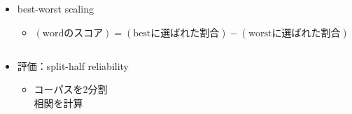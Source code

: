 \begin{frame}
\begin{enumerate}
\begin{description}
\begin{itemize}
            \end{itemize}
        \end{description}
    \end{enumerate}
    \begin{itemize}
        \item best-worst scaling
        \begin{itemize}
            \item $(\textrm{wordのスコア}) = (\textrm{bestに選ばれた割合}) - (\textrm{worstに選ばれた割合})$
        \end{itemize}
    \end{itemize}
    \begin{columns}
        \begin{column}[T]{0.5\textwidth}
            \begin{itemize}
                \item 評価：split-half reliability
                \begin{itemize}
                    \item コーパスを2分割 \\
                        相関を計算
                \end{itemize}
            \end{itemize}
        \end{column}
        \begin{column}[T]{0.5\textwidth}
        \end{column}
    \end{columns}
\end{frame}
